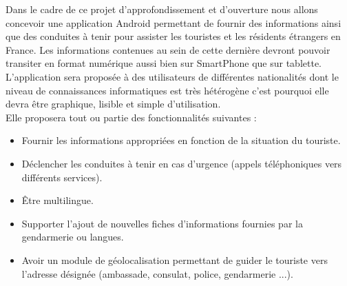 Dans le cadre de ce projet d'approfondissement et d'ouverture nous allons concevoir une application Android permettant de fournir des informations ainsi que des conduites à tenir pour assister les touristes et les résidents étrangers en France. Les informations contenues au sein de cette dernière devront pouvoir transiter en format numérique aussi bien sur SmartPhone que sur tablette. L'application sera proposée à des utilisateurs de différentes nationalités dont le niveau de connaissances informatiques est très hétérogène c'est pourquoi elle devra être graphique, lisible et simple d'utilisation. \\
	Elle proposera tout ou partie des fonctionnalités suivantes :
\begin{itemize}
	\item Fournir les informations appropriées en fonction de la situation du touriste.
	\item Déclencher les conduites à tenir en cas d'urgence (appels téléphoniques vers différents services).
	\item Être multilingue.
	\item Supporter l'ajout de nouvelles fiches d'informations fournies par la gendarmerie ou langues.
	\item Avoir un module de géolocalisation permettant de guider le touriste vers l'adresse désignée (ambassade, consulat, police, gendarmerie ...).
\end{itemize}
